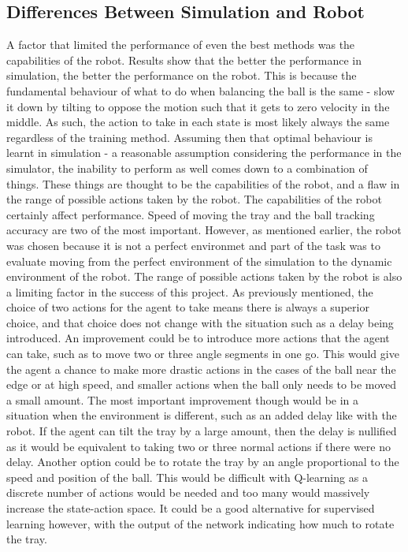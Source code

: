 \documentclass[12pt,a4paper]{article}
\begin{document}
\subsection{Differences Between Simulation and Robot}
A factor that limited the performance of even the best methods was the capabilities of the robot. Results show that the better the performance in simulation, the better the performance on the robot. This is because the fundamental behaviour of what to do when balancing the ball is the same - slow it down by tilting to oppose the motion such that it gets to zero velocity in the middle. As such, the action to take in each state is most likely always the same regardless of the training method. Assuming then that optimal behaviour is learnt in simulation - a reasonable assumption considering the performance in the simulator, the inability to perform as well comes down to a combination of things. These things are thought to be the capabilities of the robot, and a flaw in the range of possible actions taken by the robot. The capabilities of the robot certainly affect performance. Speed of moving the tray and the ball tracking accuracy are two of the most important. However, as mentioned earlier, the robot was chosen because it is not a perfect environmet and part of the task was to evaluate moving from the perfect environment of the simulation to the dynamic environment of the robot. The range of possible actions taken by the robot is also a limiting factor in the success of this project. As previously mentioned, the choice of two actions for the agent to take means there is always a superior choice, and that choice does not change with the situation such as a delay being introduced. An improvement could be to introduce more actions that the agent can take, such as to move two or three angle segments in one go. This would give the agent a chance to make more drastic actions in the cases of the ball near the edge or at high speed, and smaller actions when the ball only needs to be moved a small amount. The most important improvement though would be in a situation when the environment is different, such as an added delay like with the robot. If the agent can tilt the tray by a large amount, then the delay is nullified as it would be equivalent to taking two or three normal actions if there were no delay. Another option could be to rotate the tray by an angle proportional to the speed and position of the ball. This would be difficult with Q-learning as a discrete number of actions would be needed and too many would massively increase the state-action space. It could be a good alternative for supervised learning however, with the output of the network indicating how much to rotate the tray.
\end{document}
